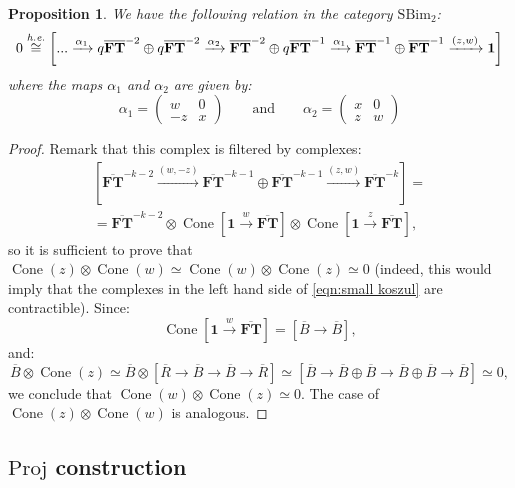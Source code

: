 \documentclass[12pt]{amsart}
\numberwithin{equation}{section}
\newtheorem{proposition}[theorem]{Proposition}
\theoremstyle{definition}
\theoremstyle{remark}
\DeclareMathOperator{\Cone}{Cone}
\newcommand{\bFT}{\overline{\FT}}
\newcommand{\FT}{\mathbf{FT}}
\renewcommand{\1}{\mathbf{1}}
\newcommand{\proj}{\mathrm{Proj}}
\newcommand{\SBim}{\mathrm{SBim}}
\newcommand{\Rred}{\overline{R}}
\newcommand{\Bred}{\overline{B}}
\newcommand{\ehe}{\emph{h.e.}}
\begin{document}
\begin{proposition}
\label{prop:koszul=0 n=2}
We have the following relation in the category $\SBim_2$:
$$
0 \stackrel{\ehe}\cong \left[ ... \xrightarrow{\alpha_1} q \bFT^{-2} \oplus q \bFT^{-2} \xrightarrow{\alpha_2}  \bFT^{-2} \oplus q \bFT^{-1} \xrightarrow{\alpha_1} \bFT^{-1} \oplus \bFT^{-1} \xrightarrow{(z,w)} \1 \right]
$$
where the maps $\alpha_1$ and $\alpha_2$ are given by:
\begin{equation}
\label{eqn:alphas}
\alpha_1 = \left( \begin{array}{cc}
w & 0 \\
-z & x \end{array} \right) \qquad \text{and} \qquad  \alpha_2 = \left( \begin{array}{cc}
x & 0 \\
z & w \end{array} \right) 
\end{equation}

\end{proposition}

\begin{proof}
Remark that this complex is filtered by complexes:
\begin{multline}
\label{eqn:small koszul}
\left[\bFT^{-k-2}  \xrightarrow{(w,-z)} \bFT^{-k-1} \oplus \bFT^{-k-1} \xrightarrow{(z,w)} \bFT^{-k} \right] = \\
= \bFT^{-k-2}\otimes \Cone\left[\1\xrightarrow{w}\bFT\right]\otimes \Cone\left[\1\xrightarrow{z}\bFT\right],
\end{multline}
so it is sufficient to prove that $\Cone(z)\otimes \Cone(w)\simeq \Cone(w)\otimes \Cone(z) \simeq 0$ (indeed, this would imply that the complexes in the left hand side of \eqref{eqn:small koszul} are contractible). Since:
$$
\Cone\left[\1\xrightarrow{w}\bFT\right]=[\Bred \xrightarrow{} \Bred],
$$
and:
$$
\Bred \otimes \Cone(z)\simeq \Bred \otimes [\Rred \to \Bred \to \Bred \to \Rred]\simeq [\Bred \to \Bred \oplus \Bred \to \Bred \oplus \Bred \to \Bred]\simeq 0,
$$
we conclude that $\Cone(w) \otimes \Cone(z) \simeq 0$. The case of $\Cone(z) \otimes \Cone(w)$ is analogous. \end{proof}

\subsection{$\proj$ construction}
\label{sub:proj construction}
\end{document}
